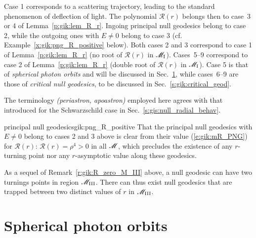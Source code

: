 Case 1 corresponds to a scattering trajectory, leading to the standard phenomenon of deflection of light. The polynomial $\mathcal{R}(r)$
belongs then to case~3 or 4 of Lemma~\ref{p:gik:lem_R_r}.
Ingoing principal null geodesics belong to case 2, while the outgoing ones with $E\neq 0$ belong to case 3
(cf. Example~\ref{x:gik:png_R_positive} below).
Both cases 2 and 3 correspond to case 1 of Lemma~\ref{p:gik:lem_R_r} (no root of $\mathcal{R}(r)$ in $\mathscr{M}_{\rm I}$).
Cases~5--9 correspond to case 2 of Lemma~\ref{p:gik:lem_R_r} (double root of $\mathcal{R}(r)$ in $\mathscr{M}_{\rm I}$).
Case 5 is that of \emph{spherical photon orbits} and will be discussed in Sec.~\ref{s:gik:spherical_orbits}, while cases~6--9 are those of \emph{critical null geodesics},
to be discussed in Sec.~\ref{s:gik:critical_geod}.

\begin{remark}
The terminology  \emph{(periastron, apoastron)} employed here agrees with that
introduced for the Schwarzschild case in Sec.~\ref{s:gis:null_radial_behav}.
\end{remark}

\begin{texample}{principal null geodesics}{gik:png_R_positive}
That the principal null geodesics with $E\neq 0$ belong to cases 2 and 3 above
is clear from their value (\ref{e:gik:mR_PNG}) for $\mathcal{R}(r)$:
$\mathcal{R}(r) = \rho^4 > 0$ in all $\mathscr{M}$, which precludes the existence
of any $r$-turning point nor any $r$-asymptotic value along these geodesics.
\end{texample}

\begin{remark}
As a sequel of Remark~\ref{r:gik:R_zero_M_III} above, a null geodesic can have
two turnings points in region $\mathscr{M}_{\rm III}$. There can thus exist null geodesics that are trapped
between two distinct values of $r$ in $\mathscr{M}_{\rm III}$.
\end{remark}




\section{Spherical photon orbits} \label{s:gik:spherical_orbits}

